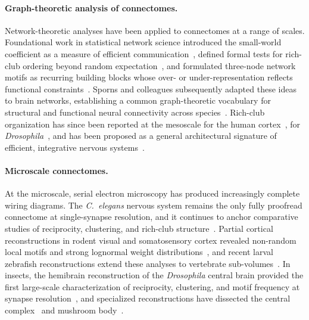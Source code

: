 \documentclass[11pt]{article}
\begin{document}
\paragraph{Graph-theoretic analysis of connectomes.}
Network-theoretic analyses have been applied to connectomes at a range of
scales. Foundational work in statistical network science introduced the
small-world coefficient as a measure of efficient
communication~\cite{watts1998collective}, defined formal tests for
rich-club ordering beyond random expectation~\cite{colizza2006detecting},
and formulated three-node network motifs as recurring building blocks whose
over- or under-representation reflects functional
constraints~\cite{milo2002network}. Sporns and colleagues subsequently
adapted these ideas to brain networks, establishing a common graph-theoretic
vocabulary for structural and functional neural connectivity across
species~\cite{sporns2004organization,bullmore2009complex}. Rich-club
organization has since been reported at the mesoscale for the human
cortex~\cite{vandenheuvel2011rich}, for \textit{Drosophila}~\cite{shih2015connectomics},
and has been proposed as a general architectural signature of efficient,
integrative nervous systems~\cite{fornito2015connectomics}.

\paragraph{Microscale connectomes.}
At the microscale, serial electron microscopy has produced increasingly
complete wiring diagrams. The \textit{C.\ elegans} nervous system remains
the only fully proofread connectome at single-synapse resolution, and it
continues to anchor comparative studies of reciprocity, clustering, and
rich-club structure~\cite{white1986structure,varshney2011structural,cook2019whole,towlson2013rich}.
Partial cortical reconstructions in rodent visual and somatosensory cortex
revealed non-random local motifs and strong lognormal weight
distributions~\cite{song2005highly,motta2019dense,loomba2022connectomic},
and recent larval zebrafish reconstructions extend these analyses to
vertebrate sub-volumes~\cite{svara2022automated}. In insects, the
hemibrain reconstruction of the \textit{Drosophila} central brain provided
the first large-scale characterization of reciprocity, clustering, and
motif frequency at synapse resolution~\cite{scheffer2020connectome}, and
specialized reconstructions have dissected the central
complex~\cite{hulse2021connectome} and mushroom
body~\cite{takemura2017complete,amin2020inhibitory}.
\end{document}
